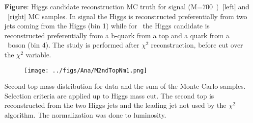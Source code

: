 \begin{frame}{}
\begin{columns}
\end{columns}

\vspace{-.5cm}
\begin{block}{}
\tiny \textbf{Figure}: Higgs candidate reconstruction MC truth for signal (M=700~\GeVcc)~[left] and \ttbar~[right] MC samples. In signal the Higgs is reconstructed preferentially from two jets coming from the Higgs (bin 1) while for \ttbar~the Higgs candidate is reconstructed preferentially from a b-quark from a top and a quark from a \W~boson (bin 4). The study is performed after $\chi^{2}$ reconstruction, before cut over the $\chi^{2}$ variable.
\end{block}

\end{frame}


\begin{frame}{}
\vspace{-.2cm}

\begin{figure}[!Hhtbp]
  \begin{center}
    \texttt{[image: ../figs/Ana/M2ndTopNm1.png]}
  \end{center}
\end{figure}

\vspace{-.2cm}
    \begin{block}{}
      \tiny \centering Second top mass distribution for data and the sum of the Monte Carlo samples. Selection criteria are applied up to Higgs mass cut. The second top is reconstructed from the two Higgs jets and the leading jet not used by the $\chi^{2}$ algorithm. The normalization was done to luminosity.
    \end{block}

\end{frame}

